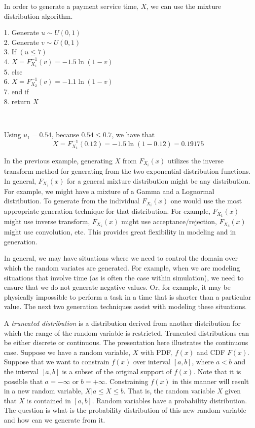 \documentclass[
]{book}
\theoremstyle{definition}
\theoremstyle{definition}
\theoremstyle{definition}
\theoremstyle{definition}
\theoremstyle{remark}
\begin{document}
In order to generate a payment service time, \(X\), we can use the mixture distribution algorithm.

1. Generate \(u \sim U(0,1)\)\\
2. Generate \(v \sim U(0,1)\)\\
3. If \((u \leq 7)\)\\
4. \(X = F^{-1}_{X_{1}}(v) = -1.5\ln \left(1-v \right)\)\\
5. else\\
6. \(X = F^{-1}_{X_{2}}(v) = -1.1\ln \left(1-v \right)\)\\
7. end if\\
8. return \(X\)

~

Using \(u_1 = 0.54\), because \(0.54 \leq 0.7\), we have that
\[
X = F^{-1}_{X_{1}}(0.12) = -1.5\ln \left(1- 0.12 \right) = 0.19175
\]

In the previous example, generating \(X\) from \(F_{X_{i}}(x)\) utilizes
the inverse transform method for generating from the two exponential
distribution functions. In general, \(F_{X_{i}}(x)\) for a general mixture
distribution might be any distribution. For example, we might have a
mixture of a Gamma and a Lognormal distribution. To generate from the
individual \(F_{X_{i}}(x)\) one would use the most appropriate generation
technique for that distribution. For example, \(F_{X_{1}}(x)\) might use
inverse transform, \(F_{X_{2}}(x)\) might use acceptance/rejection,
\(F_{X_{3}}(x)\) might use convolution, etc. This provides great
flexibility in modeling and in generation.

In general, we may have situations where we need to control the domain
over which the random variates are generated. For example, when we are
modeling situations that involve time (as is often the case within
simulation), we need to ensure that we do not generate negative values.
Or, for example, it may be physically impossible to perform a task in a
time that is shorter than a particular value. The next two generation
techniques assist with modeling these situations.

A \emph{truncated distribution} is a distribution derived from another
distribution for which the range of the random variable is restricted.
Truncated distributions can be either discrete or continuous. The
presentation here illustrates the continuous case. Suppose we have a
random variable, \(X\) with PDF, \(f(x)\) and CDF \(F(x)\). Suppose that we
want to constrain \(f(x)\) over interval \([a, b]\), where \(a<b\) and the
interval \([a, b]\) is a subset of the original support of \(f(x)\). Note
that it is possible that \(a = -\infty\) or \(b = +\infty\). Constraining
\(f(x)\) in this manner will result in a new random variable,
\(X \vert a \leq X \leq b\). That is, the random variable \(X\) given that
\(X\) is contained in \([a, b]\). Random variables have a probability
distribution. The question is what is the probability distribution of
this new random variable and how can we generate from it.
\end{document}
